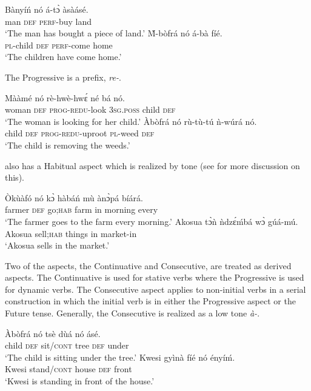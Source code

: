 \documentclass[output=paper]{langsci/langscibook}
\begin{document}
\ea\label{ex:4.osam}
\ea\label{ex:4a.osam}
\gll  Bànyíń nó  á-tɔ̀     àsàásé.\\
       man  \textsc{def}  \textsc{perf}-buy  land\\
\glt `The man has bought a piece of land.'
\ex\label{ex:4b.osam}
\gll \`{M}-bòfrá  nó  á-bà    fíé.\\
     \textsc{pl}-child  \textsc{def}  \textsc{perf}-come  home\\
\glt `The children have come home.'
\z 
\z 

The Progressive is a prefix, \textit{re-}.

\ea\label{ex:5.osam}
\ea\label{ex:5a.osam}
\gll Mààmé   nó  rè-hwè-hwɛ́     né    bá   nó.\\
       woman    \textsc{def}  \textsc{prog-redu}-look  \textsc{3sg.poss}  child  \textsc{def}\\
\glt `The woman is looking for her child.'
\ex\label{ex:5b.osam}
\gll   Àbòfrá  nó  rù-tù-tú    ǹ-wúrá    nó.\\
       child  \textsc{def}  \textsc{prog-redu}-uproot  \textsc{pl}-weed  \textsc{def}\\
\glt `The child is removing the weeds.'
\z 
\z 

 also has a Habitual aspect which is realized by tone (see \citealt{dolphyne1988} for more discussion on this).

\ea\label{ex:6.osam}
\ea\label{ex:6a.osam}
\gll Òkùàfó  nó   kɔ̀    hàbáń  mù  ànɔ̀pá    bíárá.\\
       farmer  \textsc{def}  go;\textsc{hab}    farm  in  morning  every\\
\glt `The farmer goes to the farm every morning.'
\ex\label{ex:6b.osam}
\gll Akosua    tɔ̀ǹ     ǹdzɛ́ḿbá  wɔ̀  gúá-mú.\\
       Akosua  sell;\textsc{hab}  things    in  market-in\\
\glt `Akosua sells in the market.'
\z 
\z 


Two of the aspects, the Continuative and Consecutive, are treated as derived aspects. The Continuative is used for stative verbs where the Progressive is used for dynamic verbs. The Consecutive aspect applies to non-initial verbs in a serial construction in which the initial verb is in either the Progressive aspect or the Future tense. Generally, the Consecutive is realized as a low tone \textit{à-}.

\ea\label{ex:7.osam}
\ea\label{ex:7a.osam}
\gll   Àbòfrá  nó  tsè    dùá  nó  ásé.\\
       child  \textsc{def}  sit/\textsc{cont}  tree  \textsc{def}  under\\
\glt `The child is sitting under the tree.'
\ex\label{ex:7b.osam}
\gll Kwesi  gyìnà    fíé  nó  ényíḿ.\\
       Kwesi  stand/\textsc{cont}  house  \textsc{def}  front\\
\glt `Kwesi is standing in front of the house.'
\z 
\z 
\end{document}
